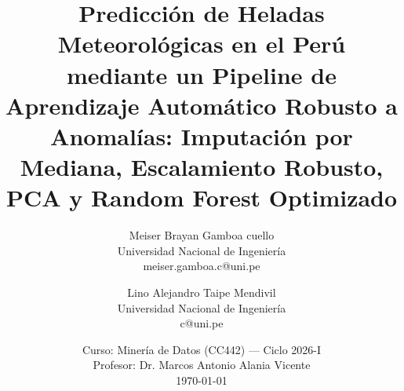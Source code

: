 \documentclass[12pt,a4paper]{article}
\begin{document}
\setlength{\parskip}{1em}    
\setlength{\parindent}{2em}


    
\title{\textbf{Predicción de Heladas Meteorológicas en el Perú mediante un Pipeline de Aprendizaje Automático Robusto a Anomalías: Imputación por Mediana, Escalamiento Robusto, PCA y Random Forest Optimizado}}
\author{
Meiser Brayan Gamboa cuello \\ 
\small Universidad Nacional de Ingeniería \\
\small meiser.gamboa.c@uni.pe
\and
Lino Alejandro Taipe Mendivil \\ 
\small Universidad Nacional de Ingeniería \\
\small c@uni.pe
}
\date{
\small
Curso: Minería de Datos (CC442) --- Ciclo 2026-I\\
Profesor: Dr. Marcos Antonio Alania Vicente\\[0.5em]
\today
}
\maketitle












\end{document}
